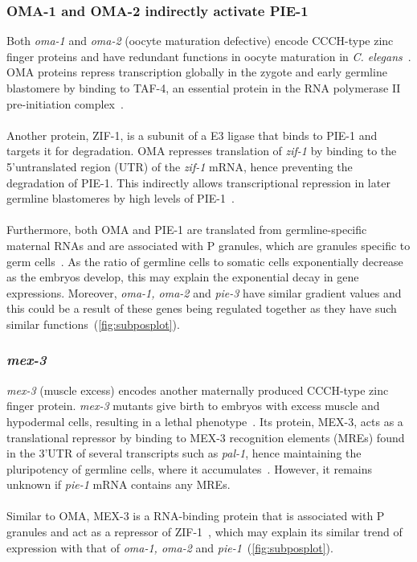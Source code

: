 \documentclass[11pt]{article}
\begin{document}
\subsubsection{OMA-1 and OMA-2 indirectly activate PIE-1}
Both \textit{oma-1} and \textit{oma-2} (oocyte maturation defective) encode CCCH-type zinc finger proteins and have redundant functions in oocyte maturation in \textit{C. elegans}~\citep{Detwiler2001}. OMA proteins repress transcription globally in the zygote and early germline blastomere by binding to TAF-4, an essential protein in the RNA  polymerase II pre-initiation complex~\citep{Guven-Ozkan2008}.
\\
\\
Another protein, ZIF-1, is a subunit of a E3 ligase that binds to PIE-1 and targets it for degradation. OMA represses translation of \textit{zif-1} by binding to the 5'untranslated region (UTR) of the \textit{zif-1} mRNA, hence preventing the degradation of PIE-1. This indirectly allows transcriptional repression in later germline blastomeres by high levels of PIE-1~\citep{Guven-Ozkan2010}. 
\\
\\
Furthermore, both OMA and PIE-1 are translated from germline-specific maternal RNAs and are associated with P granules, which are granules specific to germ cells~\citep{Shimada2006}. As the ratio of germline cells to somatic cells exponentially decrease as the embryos develop, this may explain the exponential decay in gene expressions. Moreover, \textit{oma-1, oma-2} and \textit{pie-3} have similar gradient values and this could be a result of these genes being regulated together as they have such similar functions~(\autoref{fig:subposplot}).

\subsubsection{\textit{mex-3}}
\textit{mex-3} (muscle excess) encodes another maternally produced CCCH-type zinc finger protein. \textit{mex-3} mutants give birth to embryos with excess muscle and hypodermal cells, resulting in a lethal phenotype~\citep{Pagano2009}. Its protein, MEX-3,  acts as a translational repressor by binding to MEX-3 recognition elements (MREs) found in the 3'UTR of several transcripts such as \textit{pal-1}, hence maintaining the pluripotency of germline cells, where it accumulates~\citep{Pagano2009}. However, it remains unknown if \textit{pie-1} mRNA contains any MREs.
\\
\\
Similar to OMA, MEX-3 is a RNA-binding protein that is associated with P granules and act as a repressor of ZIF-1~\citep{Draper1996, Oldenbroek2012}, which may explain its similar trend of expression with that of \textit{oma-1, oma-2} and \textit{pie-1}~(\autoref{fig:subposplot}). 
\end{document}
